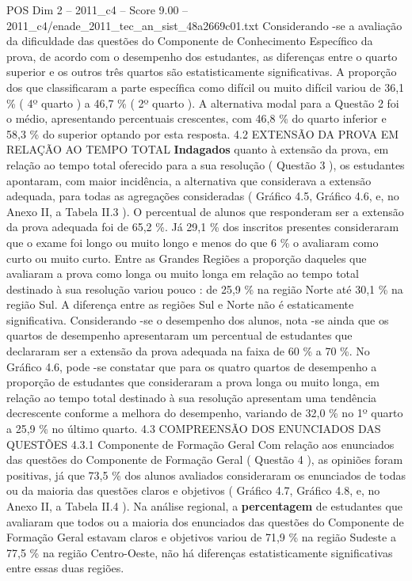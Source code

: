 \begin{textsample}{POS Dim 2 – 2011\_c4 – Score 9.00 – 2011\_c4/enade\_2011\_tec\_an\_sist\_48a2669c01.txt}
Considerando -se a avaliação da dificuldade das questões do Componente de Conhecimento Específico da prova, de acordo com o desempenho dos estudantes, as diferenças entre o quarto superior e os outros três quartos são estatisticamente significativas.
A proporção dos que classificaram a parte específica como difícil ou muito difícil variou de 36,1 \% ( 4º quarto ) a 46,7 \% ( 2º quarto ).
A alternativa modal para a Questão 2 foi o médio, apresentando percentuais crescentes, com 46,8 \% do quarto inferior e 58,3 \% do superior optando por esta resposta. 4.2 EXTENSÃO DA PROVA EM RELAÇÃO AO TEMPO TOTAL \textbf{Indagados} quanto à extensão da prova, em relação ao tempo total oferecido para a sua resolução ( Questão 3 ), os estudantes apontaram, com maior incidência, a alternativa que considerava a extensão adequada, para todas as agregações consideradas ( Gráfico 4.5, Gráfico 4.6, e, no Anexo II, a Tabela II.3 ).
O percentual de alunos que responderam ser a extensão da prova adequada foi de 65,2 \%.
Já 29,1 \% dos inscritos presentes consideraram que o exame foi longo ou muito longo e menos do que 6 \% o avaliaram como curto ou muito curto.
Entre as Grandes Regiões a proporção daqueles que avaliaram a prova como longa ou muito longa em relação ao tempo total destinado à sua resolução variou pouco : de 25,9 \% na região Norte até 30,1 \% na região Sul.
A diferença entre as regiões Sul e Norte não é estaticamente significativa.
Considerando -se o desempenho dos alunos, nota -se ainda que os quartos de desempenho apresentaram um percentual de estudantes que declararam ser a extensão da prova adequada na faixa de 60 \% a 70 \%.
No Gráfico 4.6, pode -se constatar que para os quatro quartos de desempenho a proporção de estudantes que consideraram a prova longa ou muito longa, em relação ao tempo total destinado à sua resolução apresentam uma tendência decrescente conforme a melhora do desempenho, variando de 32,0 \% no 1º quarto a 25,9 \% no último quarto. 4.3 COMPREENSÃO DOS ENUNCIADOS DAS QUESTÕES 4.3.1 Componente de Formação Geral Com relação aos enunciados das questões do Componente de Formação Geral ( Questão 4 ), as opiniões foram positivas, já que 73,5 \% dos alunos avaliados consideraram os enunciados de todas ou da maioria das questões claros e objetivos ( Gráfico 4.7, Gráfico 4.8, e, no Anexo II, a Tabela II.4 ).
Na análise regional, a \textbf{percentagem} de estudantes que avaliaram que todos ou a maioria dos enunciados das questões do Componente de Formação Geral estavam claros e objetivos variou de 71,9 \% na região Sudeste a 77,5 \% na região Centro-Oeste, não há diferenças estatisticamente significativas entre essas duas regiões.

\end{textsample}
